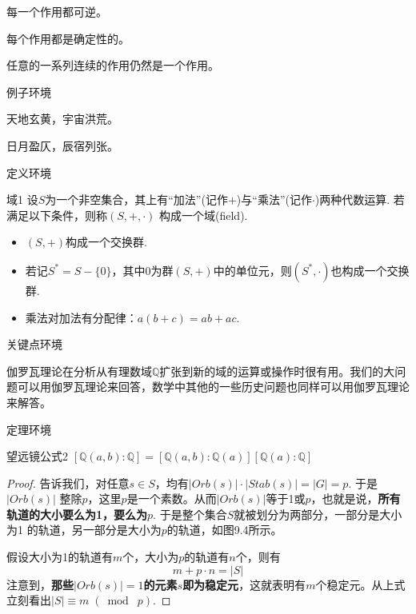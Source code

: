 \begin{myprop}{}{}
	每一个作用都可逆。
\end{myprop}

\begin{myprop}{}{}
	每个作用都是确定性的。
\end{myprop}

\begin{myprop}{}{}
	任意的一系列连续的作用仍然是一个作用。
\end{myprop}

例子环境
\begin{example}
	天地玄黄，宇宙洪荒。
	\soln
	
	日月盈仄，辰宿列张。
\end{example}

定义环境
\begin{mydef}{域}{1}
	设$S$为一个非空集合，其上有“加法”(记作$+$)与“乘法”(记作$\cdot$)两种代数运算. 若满足以下条件，则称$(S,+,\cdot)$ 构成一个域(field).
	\begin{itemize}
		\item[(1)] $(S,+)$构成一个交换群.
		\item[(2)] 若记$S^{*}=S-\{0\}$，其中$0$为群$(S,+)$中的单位元，则$(S^{*},\cdot)$也构成一个交换群.
		\item[(3)] 乘法对加法有分配律：$a ( b + c ) = a b + a c$.
	\end{itemize}
\end{mydef}

关键点环境
\begin{keypoint}
	伽罗瓦理论在分析从有理数域$\mathbb{ Q }$扩张到新的域的运算或操作时很有用。我们的大问题可以用伽罗瓦理论来回答，数学中其他的一些历史问题也同样可以用伽罗瓦理论来解答。
\end{keypoint}

定理环境
\begin{mythm}{望远镜公式}{2}
	$\left[\mathbb{Q}(a, b) : \mathbb{Q}\right]=\left[\mathbb{Q}(a, b) : \mathbb{Q}(a)\right]\left[\mathbb{Q}(a) : \mathbb{Q}\right] $
\end{mythm}

\begin{proof}
	
	告诉我们，对任意$s\in S$，均有$\lvert Orb(s)\rvert \cdot \lvert Stab(s)\rvert=\lvert G\rvert=p$. 于是$\lvert Orb(s)\rvert $ 整除$p$，这里$p$是一个素数。从而$\lvert Orb(s)\rvert $等于1或$p$，也就是说，\textbf{所有轨道的大小要么为1，要么为$p$}. 于是整个集合$S$就被划分为两部分，一部分是大小为1 的轨道，另一部分是大小为$p$的轨道，如图9.4所示。
	
	假设大小为1的轨道有$m$个，大小为$p$的轨道有$n$个，则有
 \begin{equation}
		m+p\cdot n=\lvert S\rvert
 \end{equation}
	注意到，\textbf{那些$\lvert Orb(s)\rvert =1$的元素$s$即为稳定元}，这就表明有$m$个稳定元。从上式立刻看出$\lvert S \rvert \equiv  m\; (\bmod\; p)$.	
\end{proof}

